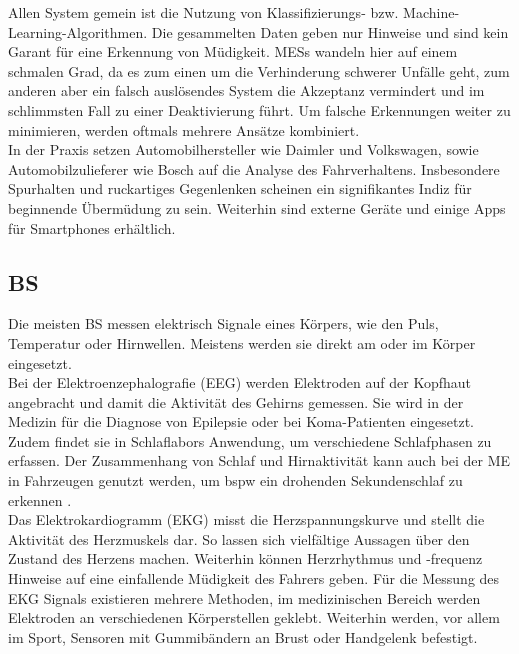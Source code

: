 {Allen System gemein ist die Nutzung von Klassifizierungs- bzw. Machine-Learning-Algorithmen. Die gesammelten Daten geben nur Hinweise und sind kein Garant für eine Erkennung von Müdigkeit. \acl{MESs} wandeln hier auf einem schmalen Grad, da es zum einen um die Verhinderung schwerer Unfälle geht, zum anderen aber ein falsch auslösendes System die Akzeptanz vermindert und im schlimmsten Fall zu einer Deaktivierung führt. Um falsche Erkennungen weiter zu minimieren, werden oftmals mehrere Ansätze kombiniert.\\

In der Praxis setzen Automobilhersteller wie Daimler \cite{Daimler} und Volkswagen, sowie Automobilzulieferer wie Bosch \cite{Bosch} auf die Analyse des Fahrverhaltens. Insbesondere Spurhalten und ruckartiges Gegenlenken scheinen ein signifikantes Indiz für beginnende Übermüdung zu sein. Weiterhin sind externe Geräte und einige Apps für Smartphones erhältlich.

\subsection{\acl{BS}}
Die meisten \acl{BS} messen elektrisch Signale eines Körpers, wie den Puls, Temperatur oder Hirnwellen. Meistens werden sie direkt am oder im Körper eingesetzt.\\

Bei der Elektroenzephalografie (EEG) werden Elektroden auf der Kopfhaut angebracht und damit die Aktivität des Gehirns gemessen. Sie wird in der Medizin für die Diagnose von Epilepsie oder bei Koma-Patienten eingesetzt. Zudem findet sie in Schlaflabors Anwendung, um verschiedene Schlafphasen zu erfassen. Der Zusammenhang von Schlaf und Hirnaktivität kann auch bei der \acl{ME} in Fahrzeugen genutzt werden, um \acl{bspw} ein drohenden Sekundenschlaf zu erkennen \cite{Santamaria_eeg}. \\

Das Elektrokardiogramm (EKG) misst die Herzspannungskurve und stellt die Aktivität des Herzmuskels dar. So lassen sich vielfältige Aussagen über den Zustand des Herzens machen. Weiterhin können Herzrhythmus und -frequenz Hinweise auf eine einfallende Müdigkeit des Fahrers geben. Für die Messung des EKG Signals existieren mehrere Methoden, im medizinischen Bereich werden Elektroden an verschiedenen Körperstellen geklebt. Weiterhin werden, vor allem im Sport, Sensoren mit Gummibändern an Brust oder Handgelenk befestigt. \\

}
